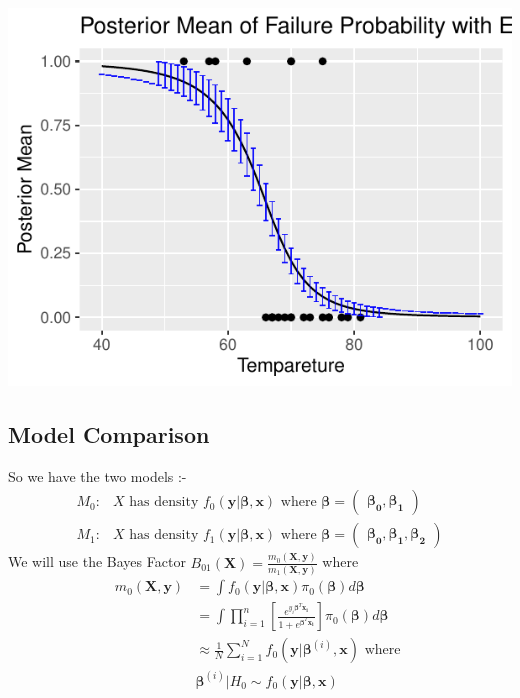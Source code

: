 \documentclass[11pt,english]{article}\usepackage[]{graphicx}\usepackage[]{xcolor}
\makeatletter
\def\maxwidth{ %
  \ifdim\Gin@nat@width>\linewidth
    \linewidth
  \else
    \Gin@nat@width
  \fi
}
\newenvironment{knitrout}{}{} %
\makeatother
\begin{document}
\begin{center}
\begin{knitrout}
\includegraphics[width=\maxwidth]{figure/unnamed-chunk-26-1} 
\end{knitrout}
\par\end{center}
\author{\pagebreak}

\subsection*{Model Comparison}

So we have the two models :-
\begin{align*}
M_{0}: & X\text{ has density }f_{0}\left(\boldsymbol{y}|\boldsymbol{\beta,x}\right)\text{ where }\boldsymbol{\beta=\begin{pmatrix}\beta_{0},\beta_{1}\end{pmatrix}}\\
M_{1}: & X\text{ has density }f_{1}\left(\boldsymbol{y}|\boldsymbol{\beta,x}\right)\text{ where }\boldsymbol{\beta=\begin{pmatrix}\beta_{0},\beta_{1},\beta_{2}\end{pmatrix}}
\end{align*}
 We will use the Bayes Factor $B_{01}\left(\boldsymbol{X}\right)=\frac{m_{0}\left(\boldsymbol{X,y}\right)}{m_{1}\left(\boldsymbol{X,y}\right)}$
where 
\begin{align*}
m_{0}\left(\boldsymbol{X,y}\right) & =\int f_{0}\left(\boldsymbol{y}|\boldsymbol{\beta},\boldsymbol{x}\right)\pi_{0}\left(\boldsymbol{\beta}\right)d\boldsymbol{\beta}\\
 & =\int\prod\limits _{i=1}^{n}\left[\frac{e^{y_{i}\boldsymbol{\beta}^{T}\boldsymbol{x_{i}}}}{1+e^{\boldsymbol{\beta}^{T}\boldsymbol{x_{i}}}}\right]\pi_{0}\left(\boldsymbol{\beta}\right)d\boldsymbol{\beta}\\
 & \approx\frac{1}{N}\sum_{i=1}^{N}f_{0}\left(\boldsymbol{y}|\boldsymbol{\beta}^{\left(i\right)},\boldsymbol{x}\right)\text{ where }\\
 & \boldsymbol{\beta}^{\left(i\right)}|H_{0}\sim f_{0}\left(\boldsymbol{y}|\boldsymbol{\beta,x}\right)
\end{align*}
\end{document}
